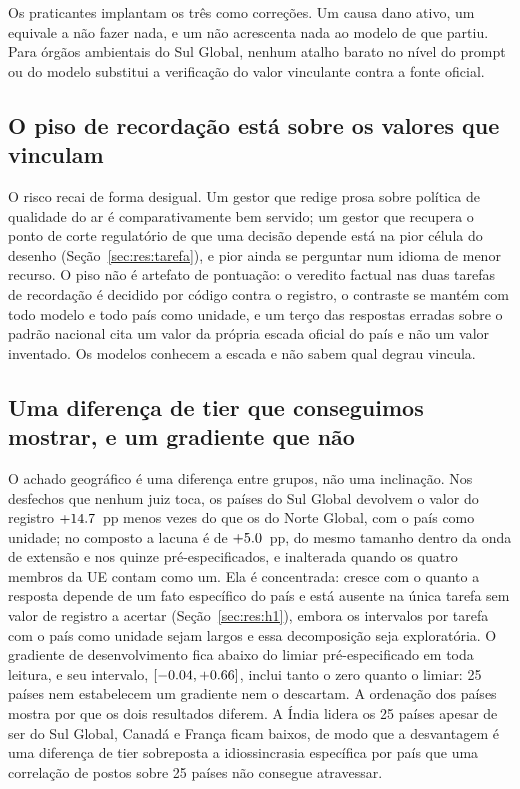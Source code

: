 Os praticantes implantam os três como correções. Um causa dano ativo, um
equivale a não fazer nada, e um não acrescenta nada ao modelo de que partiu. Para órgãos
ambientais do Sul Global, nenhum atalho barato no nível do prompt ou do modelo
substitui a verificação do valor vinculante contra a fonte oficial.

\subsection{O piso de recordação está sobre os valores que vinculam}

O risco recai de forma desigual. Um gestor que redige prosa sobre política de
qualidade do ar é comparativamente bem servido; um gestor que recupera o ponto
de corte regulatório de que uma decisão depende está na pior célula do desenho
(Seção~\ref{sec:res:tarefa}), e pior ainda se perguntar num idioma de menor
recurso. O piso não é artefato de pontuação: o veredito factual nas duas
tarefas de recordação é decidido por código contra o registro, o contraste se
mantém com todo modelo e todo país como unidade, e um terço das respostas
erradas sobre o padrão nacional cita um valor da própria escada oficial do país
e não um valor inventado. Os modelos conhecem a escada e não sabem qual degrau
vincula.

\subsection{Uma diferença de tier que conseguimos mostrar, e um gradiente que não}

O achado geográfico é uma diferença entre grupos, não uma inclinação. Nos
desfechos que nenhum juiz toca, os países do Sul Global devolvem o valor do
registro $+14.7$~pp menos vezes do que os do Norte Global, com o país como
unidade; no composto a lacuna é de $+5.0$~pp, do mesmo tamanho dentro da
onda de extensão e nos quinze pré-especificados, e inalterada quando os quatro
membros da UE contam como um. Ela é concentrada: cresce com o quanto a resposta
depende de um fato específico do país e está ausente na única tarefa sem valor
de registro a acertar (Seção~\ref{sec:res:h1}), embora os intervalos por tarefa
com o país como unidade sejam largos e essa decomposição seja exploratória. O
gradiente de desenvolvimento fica abaixo do limiar pré-especificado em toda
leitura, e seu intervalo, $[-0.04,+0.66]$, inclui tanto o zero quanto o
limiar: 25 países nem estabelecem um gradiente nem o descartam. A ordenação dos
países mostra por que os dois resultados diferem. A Índia lidera os 25 países
apesar de ser do Sul Global, Canadá e França ficam baixos, de modo que a
desvantagem é uma diferença de tier sobreposta a idiossincrasia específica por
país que uma correlação de postos sobre 25 países não consegue atravessar.

